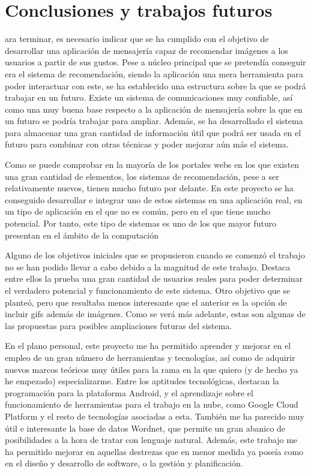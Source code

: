\chapter{Conclusiones y trabajos futuros}
\label{chap:conclusiones}

\noindent
{}ara terminar, es necesario indicar que se ha cumplido con el objetivo de desarrollar una aplicación de mensajería capaz de recomendar imágenes a los usuarios a partir de sus gustos. Pese a núcleo principal que se pretendía conseguir era el sistema de recomendación, siendo la aplicación una mera herramienta para poder interactuar con este, se ha establecido una estructura sobre la que se podrá trabajar en un futuro. Existe un sistema de comunicaciones muy confiable, así como una muy buena base respecto a la aplicación de mensajería sobre la que en un futuro se podría trabajar para ampliar. Además, se ha desarrollado el sistema para almacenar una gran cantidad de información útil que podrá ser usada en el futuro para combinar con otras técnicas y poder mejorar aún más el sistema.

Como se puede comprobar en la mayoría de los portales webs en los que existen una gran cantidad de elementos, los sistemas de recomendación, pese a ser relativamente nuevos, tienen mucho futuro por delante. En este proyecto se ha conseguido desarrollar e integrar uno de estos sistemas en una aplicación real, en un tipo de aplicación en el que no es común, pero en el que tiene mucho potencial. Por tanto, este tipo de sistemas es uno de los que mayor futuro presentan en el ámbito de la computación

Alguno de los objetivos iniciales que se propusieron cuando se comenzó el trabajo no se han podido llevar a cabo debido a la magnitud de este trabajo. Destaca entre ellos la prueba una gran cantidad de usuarios reales para poder determinar el verdadero potencial y funcionamiento de este sistema. Otro objetivo que se planteó, pero que resultaba menos interesante que el anterior es la opción de incluir gifs además de imágenes. Como se verá más adelante, estas son algunas de las propuestas para posibles ampliaciones futuras del sistema.


En el plano personal, este proyecto me ha permitido aprender y mejorar en el empleo de un gran número de herramientas y tecnologías, así como de adquirir nuevos marcos teóricos muy útiles para la rama en la que quiero (y de hecho ya he empezado) especializarme. Entre los aptitudes tecnológicas, destacan la programación para la plataforma Android, y el aprendizaje sobre el funcionamiento de herramientas para el trabajo en la nube, como Google Cloud Platform y el resto de tecnologías asociadas a esta. También me ha parecido muy útil e interesante la base de datos Wordnet, que permite un gran abanico de posibilidades a la hora de tratar con lenguaje natural. Además, este trabajo me ha permitido mejorar en aquellas destrezas que en menor medida ya poseía como en el diseño y desarrollo de software, o la gestión y planificación.

